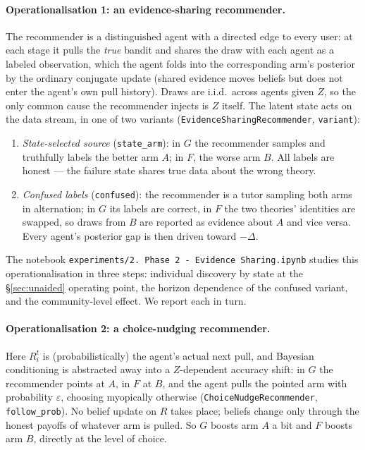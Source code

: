 \documentclass[12pt]{article}
\begin{document}
\paragraph{Operationalisation 1: an evidence-sharing recommender.}
The recommender is a distinguished agent with a directed edge to every user: at each stage it pulls the \emph{true} bandit and shares the draw with each agent as a labeled observation, which the agent folds into the corresponding arm's posterior by the ordinary conjugate update (shared evidence moves beliefs but does not enter the agent's own pull history). Draws are i.i.d.\ across agents given $Z$, so the only common cause the recommender injects is $Z$ itself. The latent state acts on the data stream, in one of two variants (\texttt{EvidenceSharingRecommender}, \texttt{variant}):
\begin{enumerate}[leftmargin=*]
  \item \emph{State-selected source} (\texttt{state\_arm}): in $G$ the recommender samples and truthfully labels the better arm $A$; in $F$, the worse arm $B$. All labels are honest --- the failure state shares true data about the wrong theory.
  \item \emph{Confused labels} (\texttt{confused}): the recommender is a tutor sampling both arms in alternation; in $G$ its labels are correct, in $F$ the two theories' identities are swapped, so draws from $B$ are reported as evidence about $A$ and vice versa. Every agent's posterior gap is then driven toward $-\Delta$.
\end{enumerate}
The notebook \texttt{experiments/2.\ Phase 2 - Evidence Sharing.ipynb} studies this operationalisation in three steps: individual discovery by state at the \S\ref{sec:unaided} operating point, the horizon dependence of the confused variant, and the community-level effect. We report each in turn.

\paragraph{Operationalisation 2: a choice-nudging recommender.}
Here $R_i^t$ is (probabilistically) the agent's actual next pull, and Bayesian conditioning is abstracted away into a $Z$-dependent accuracy shift: in $G$ the recommender points at $A$, in $F$ at $B$, and the agent pulls the pointed arm with probability $\varepsilon$, choosing myopically otherwise (\texttt{ChoiceNudgeRecommender}, \texttt{follow\_prob}). No belief update on $R$ takes place; beliefs change only through the honest payoffs of whatever arm is pulled. So $G$ boosts arm $A$ a bit and $F$ boosts arm $B$, directly at the level of choice.
\end{document}
